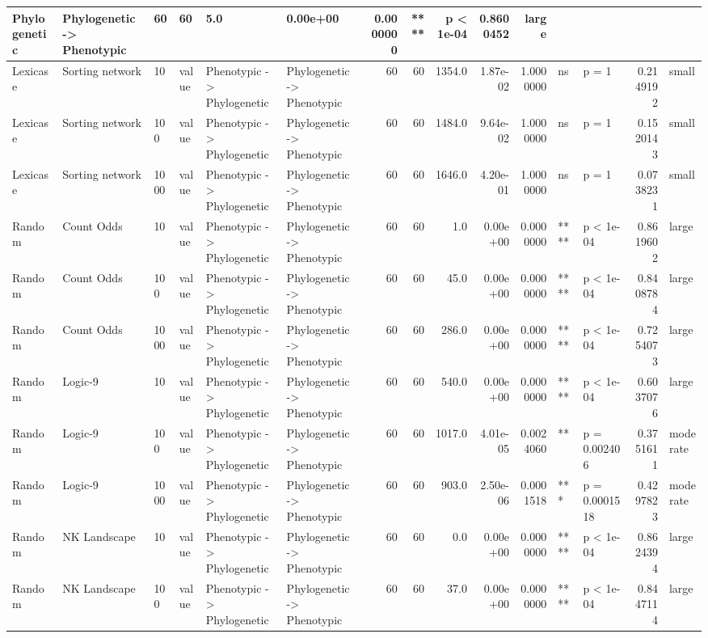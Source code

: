 \documentclass[]{book}
\begin{document}
\begin{table}
\begin{tabular}[t]{l|l|l|l|l|l|r|r|r|r|r|l|l|r|l}
Phylogenetic & Phylogenetic
    ->
Phenotypic & 60 & 60 & 5.0 & 0.00e+00 & 0.0000000 & **** & p < 1e-04 & 0.8600452 & large\\
\hline
Lexicase & Sorting network & 10 & value & Phenotypic
    ->
Phylogenetic & Phylogenetic
    ->
Phenotypic & 60 & 60 & 1354.0 & 1.87e-02 & 1.0000000 & ns & p = 1 & 0.2149192 & small\\
\hline
Lexicase & Sorting network & 100 & value & Phenotypic
    ->
Phylogenetic & Phylogenetic
    ->
Phenotypic & 60 & 60 & 1484.0 & 9.64e-02 & 1.0000000 & ns & p = 1 & 0.1520143 & small\\
\hline
Lexicase & Sorting network & 1000 & value & Phenotypic
    ->
Phylogenetic & Phylogenetic
    ->
Phenotypic & 60 & 60 & 1646.0 & 4.20e-01 & 1.0000000 & ns & p = 1 & 0.0738231 & small\\
\hline
Random & Count Odds & 10 & value & Phenotypic
    ->
Phylogenetic & Phylogenetic
    ->
Phenotypic & 60 & 60 & 1.0 & 0.00e+00 & 0.0000000 & **** & p < 1e-04 & 0.8619602 & large\\
\hline
Random & Count Odds & 100 & value & Phenotypic
    ->
Phylogenetic & Phylogenetic
    ->
Phenotypic & 60 & 60 & 45.0 & 0.00e+00 & 0.0000000 & **** & p < 1e-04 & 0.8408784 & large\\
\hline
Random & Count Odds & 1000 & value & Phenotypic
    ->
Phylogenetic & Phylogenetic
    ->
Phenotypic & 60 & 60 & 286.0 & 0.00e+00 & 0.0000000 & **** & p < 1e-04 & 0.7254073 & large\\
\hline
Random & Logic-9 & 10 & value & Phenotypic
    ->
Phylogenetic & Phylogenetic
    ->
Phenotypic & 60 & 60 & 540.0 & 0.00e+00 & 0.0000000 & **** & p < 1e-04 & 0.6037076 & large\\
\hline
Random & Logic-9 & 100 & value & Phenotypic
    ->
Phylogenetic & Phylogenetic
    ->
Phenotypic & 60 & 60 & 1017.0 & 4.01e-05 & 0.0024060 & ** & p = 0.002406 & 0.3751611 & moderate\\
\hline
Random & Logic-9 & 1000 & value & Phenotypic
    ->
Phylogenetic & Phylogenetic
    ->
Phenotypic & 60 & 60 & 903.0 & 2.50e-06 & 0.0001518 & *** & p = 0.0001518 & 0.4297823 & moderate\\
\hline
Random & NK Landscape & 10 & value & Phenotypic
    ->
Phylogenetic & Phylogenetic
    ->
Phenotypic & 60 & 60 & 0.0 & 0.00e+00 & 0.0000000 & **** & p < 1e-04 & 0.8624394 & large\\
\hline
Random & NK Landscape & 100 & value & Phenotypic
    ->
Phylogenetic & Phylogenetic
    ->
Phenotypic & 60 & 60 & 37.0 & 0.00e+00 & 0.0000000 & **** & p < 1e-04 & 0.8447114 & large\\

\end{tabular}
\end{table}
\end{document}

